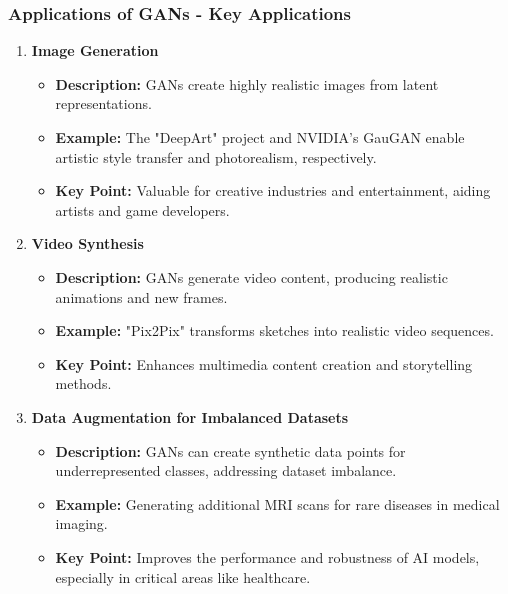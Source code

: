 \documentclass[aspectratio=169]{beamer}
\begin{document}
\begin{frame}[fragile]
    \frametitle{Applications of GANs - Key Applications}
    \begin{enumerate}
        \item \textbf{Image Generation}
            \begin{itemize}
                \item \textbf{Description:} GANs create highly realistic images from latent representations.
                \item \textbf{Example:} The "DeepArt" project and NVIDIA's GauGAN enable artistic style transfer and photorealism, respectively.
                \item \textbf{Key Point:} Valuable for creative industries and entertainment, aiding artists and game developers.
            \end{itemize}
        
        \item \textbf{Video Synthesis}
            \begin{itemize}
                \item \textbf{Description:} GANs generate video content, producing realistic animations and new frames.
                \item \textbf{Example:} "Pix2Pix" transforms sketches into realistic video sequences.
                \item \textbf{Key Point:} Enhances multimedia content creation and storytelling methods.
            \end{itemize}
        
        \item \textbf{Data Augmentation for Imbalanced Datasets}
            \begin{itemize}
                \item \textbf{Description:} GANs can create synthetic data points for underrepresented classes, addressing dataset imbalance.
                \item \textbf{Example:} Generating additional MRI scans for rare diseases in medical imaging.
                \item \textbf{Key Point:} Improves the performance and robustness of AI models, especially in critical areas like healthcare.
            \end{itemize}
    \end{enumerate}
\end{frame}
\end{document}
